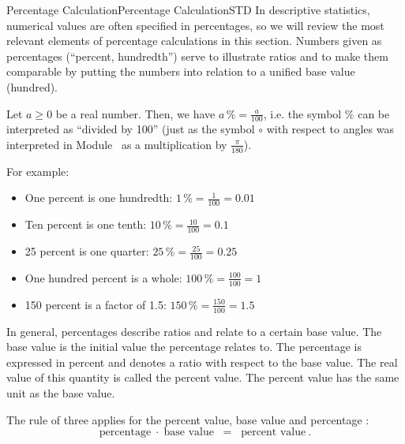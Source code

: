 \begin{MXContent}{Percentage Calculation}{Percentage Calculation}{STD}
In descriptive statistics, numerical values are often specified in percentages, so we will review the most relevant 
elements of percentage calculations in this section. Numbers given as percentages (``percent, hundredth'') serve to 
illustrate ratios and to make them comparable by putting the numbers into relation to a unified  base value (hundred).

\begin{MInfo}
Let $a\geq 0$ be a real number. Then, we have $a\,\% = \frac{a}{100}$, i.e. the symbol $\%$ can be interpreted as 
``divided by 100'' (just as the symbol $\circ$ with respect to angles was interpreted in Module~ as a multiplication 
by $\frac{\pi}{180}$).
\end{MInfo}


For example:
\begin{itemize}
\item{One percent is one hundredth: $1\,\%=\frac{1}{100}=0.01$}
\item{Ten percent is one tenth: $10\,\%=\frac{10}{100}=0.1$}
\item{25 percent is one quarter: $25\,\%=\frac{25}{100}=0.25$}
\item{One hundred percent is a whole: $100\,\%=\frac{100}{100}=1$}
\item{150 percent is a factor of 1.5: $150\,\%=\frac{150}{100}=1.5$}
\end{itemize}

In general, percentages describe ratios and relate to a certain base value. The base value is the initial 
value the percentage relates to. The percentage is expressed in percent and denotes a ratio with respect to
the base value. The real value of this quantity is called the percent value. The percent value has the same 
unit as the base value. 

\begin{MInfo}
The rule of three applies for the percent value, base value and percentage :
$$
\text{percentage}\;\cdot\;\text{base value}\;\; =\;\;\text{percent value}\: .
$$
\end{MInfo}

\end{MXContent}

